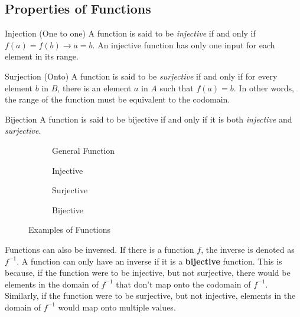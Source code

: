 \documentclass[12pt]{article}
\begin{document}
\subsection{Properties of Functions}
\label{ssec:propertiesOfFunctions}

\begin{definition}{Injection (One to one)}
  A function is said to be \textit{injective} if and only if $f(a) = f(b) \rightarrow a = b$.
  An injective function has only one input for each element in its range.
\end{definition}

\begin{definition}{Surjection (Onto)}
  A function is said to be \textit{surjective} if and only if for every element $b$ in $B$, there
  is an element $a$ in $A$ such that $f(a) = b$. In other words, the range of the function
  must be equivalent to the codomain.
\end{definition}

\begin{definition}{Bijection}
  A function is said to be bijective if and only if it is both \textit{injective} and \textit{surjective}.
\end{definition}

\begin{figure}[H]
  \centering
  \begin{subfigure}[H]{0.24\textwidth}
    \centering
    
    \caption{General Function}
    \label{fig:009}
  \end{subfigure}
  \begin{subfigure}[H]{0.24\textwidth}
    \centering
    
    \caption{Injective}
    \label{fig:010}
  \end{subfigure}
  \begin{subfigure}[H]{0.24\textwidth}
    \centering
    
    \caption{Surjective}
    \label{fig:011}
  \end{subfigure}
  \begin{subfigure}[H]{0.24\textwidth}
    \centering
    
    \caption{Bijective}
    \label{fig:012}
  \end{subfigure}
  \caption{Examples of Functions}
  \label{fig:examplesOfFunctions}
\end{figure}

Functions can also be inversed. If there is a function $f$, the inverse is denoted as $f^{-1}$.
A function can only have an inverse if it is a \textbf{bijective} function. This is because,
if the function were to be injective, but not surjective, there would be elements in the domain of $f^{-1}$
that don't map onto the codomain of $f^{-1}$. Similarly, if the function were to be surjective,
but not injective, elements in the domain of $f^{-1}$ would map onto multiple values.
\end{document}
